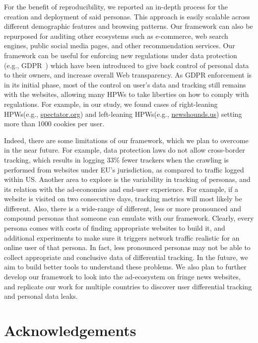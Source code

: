 \documentclass{article}
\newcommand{\hpws}{HPWs\xspace}
\begin{document}
For the benefit of reproducibility, we reported an in-depth process for the creation and deployment of said personas.
This approach is easily scalable across different demographic features and browsing patterns.
Our framework can also be repurposed for auditing other ecosystems such as  e-commerce, web search engines, public social media pages, and other recommendation services.
Our framework can be useful for enforcing new regulations under data protection (e.g., GDPR~\cite{europeanDataRules2018}) which have been introduced to give back control of personal data to their owners, and increase overall Web transparency.
As GDPR enforcement is in its initial phase, most of the control on user's data and tracking still remains with the websites, allowing many \hpws to take liberties on how to comply with regulations.
For example, in our study, we found cases of right-leaning \hpws (e.g., \url{spectator.org}) and left-leaning \hpws (e.g., \url{newshounds.us}) setting more than 1000 cookies per user.

Indeed, there are some limitations of our framework, which we plan to overcome in the near future.
For example, data protection laws do not allow cross-border tracking, which results in logging 33\% fewer trackers when the crawling is performed from websites under EU's jurisdiction, as compared to traffic logged within US.
Another area to explore is the variability in tracking of personas, and its relation with the ad-economies and end-user experience.
For example, if a website is visited on two consecutive days, tracking metrics will most likely be different.
Also, there is a wide-range of different, less or more pronounced and compound personas that someone can emulate with our framework.
Clearly, every persona comes with costs of finding appropriate websites to build it, and additional experiments to make sure it triggers network traffic realistic for an online user of that persona.
In fact, less pronounced personas may not be able to collect appropriate and conclusive data of differential tracking.
In the future, we aim to build better tools to understand these problems.
We also plan to further develop our framework to look into the ad-ecosystem on fringe news websites, and replicate our work for multiple countries to discover user differential tracking and personal data leaks.

\section{Acknowledgements}
\end{document}
